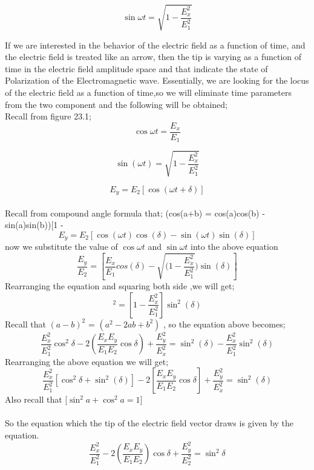 \begin{equation}
   \sin {\omega t} = \sqrt{1 - \frac{E_{x}^2}{E_{1}^2}}
\end{equation}

If we are interested in the behavior of the electric field as a function of time, and the electric field is treated like an arrow, then the tip is varying as a function of time in the electric field amplitude space and that indicate the state of Polarization of the Electromagnetic wave. Essentially, we are looking for the locus of the electric field as a function of time,so we will eliminate time parameters from the two component and the following will be obtained;\\
Recall from figure 23.1; 
\begin{equation}
\cos{\omega t} = \frac{E_x}{E_1}
\end{equation}

\begin{equation}
  \sin (\omega t) = \sqrt{1-\frac{E_{x}^2}{E_{1}^2}}
\end{equation}

\begin{equation}
E_y = E_2 [\cos(\omega t + \delta )]
\end{equation}\\

Recall from compound angle formula that; (cos(a+b) = cos(a)cos(b) - sin(a)sin(b))[1 - 
\begin{equation}
E_y = E_2 [\cos(\omega t)\cos(\delta) -\sin(\omega t) \sin(\delta)]
\end{equation}
now we substitute the value of $\cos{\omega t}$ and $\sin {\omega t}$ into the above equation
\begin{equation}
\frac{E_y}{E_2} =[\frac{E_x}{E_1}cos(\delta) -\sqrt{(1 - \frac{E_{x}^2}{E_{1}^2}})\sin(\delta)]
\end{equation}
Rearranging the equation and squaring both side ,we will get;
\begin{equation}
[\frac{E_x}{E_1}\cos{\delta }-\frac{E_y}{E_2}]^2 = [1 - \frac{E_{x}^2}{E_{1}^2}]\sin ^2(\delta)
\end{equation}
Recall that $(a - b)^2$ = $(a^2 -2ab +b^2)$ , so the equation above becomes;
\begin{equation}
 \frac{E_{x}^2}{E_{1}^2}\cos ^2{\delta} -2(\frac{E_{x}E_{y}}{E_{1}E_{2}}\cos{\delta}) +  \frac{E_{y}^2}{E_{x}^2} = \sin ^2(\delta) - \frac{E_{x}^2}{E_{1}^2}\sin ^2(\delta)
\end{equation}
Rearranging the above equation we will get;
\begin{equation}
 \frac{E_{x}^2}{E_{1}^2}[\cos ^2{\delta} + \sin ^2(\delta)] - 2[\frac{E_{x}E_{y}}{E_{1}E_{2}}\cos{\delta}] + \frac{E_{y}^2}{E_{x}^2} = \sin ^2(\delta)
\end{equation}
Also recall that [$ \sin ^2{a} + \cos ^2{a} =  1$]\\
\\So the equation which the tip of the electric field vector draws is given by the equation.
\begin{equation}
 \frac{E_{x}^2}{E_{1}^2} -2(\frac{E_{x}E_{y}}{E_{1}E_{2}})\cos\delta + \frac{E_{y}^2}{E_{2}^2} =\sin^2 \delta
\end{equation}


